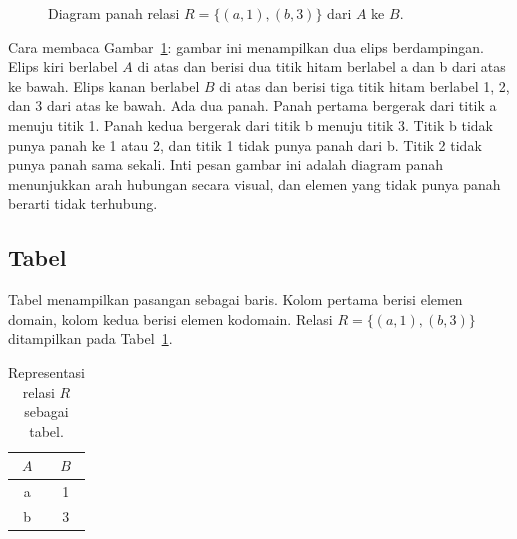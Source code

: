 \documentclass[11pt,a4paper]{article}
\begin{document}
\begin{figure}[H]
	\centering
	\caption{Diagram panah relasi $R=\{(a,1),(b,3)\}$ dari $A$ ke $B$.}
	\label{fig:panah}
\end{figure}

Cara membaca Gambar~\ref{fig:panah}: gambar ini menampilkan dua elips berdampingan. Elips kiri berlabel $A$ di atas dan berisi dua titik hitam berlabel a dan b dari atas ke bawah. Elips kanan berlabel $B$ di atas dan berisi tiga titik hitam berlabel 1, 2, dan 3 dari atas ke bawah. Ada dua panah. Panah pertama bergerak dari titik a menuju titik 1. Panah kedua bergerak dari titik b menuju titik 3. Titik b tidak punya panah ke 1 atau 2, dan titik 1 tidak punya panah dari b. Titik 2 tidak punya panah sama sekali. Inti pesan gambar ini adalah diagram panah menunjukkan arah hubungan secara visual, dan elemen yang tidak punya panah berarti tidak terhubung.

\subsection{Tabel}

Tabel menampilkan pasangan sebagai baris. Kolom pertama berisi elemen domain, kolom kedua berisi elemen kodomain. Relasi $R=\{(a,1),(b,3)\}$ ditampilkan pada Tabel~\ref{tab:relasi-tabel}.

\begin{table}[H]
	\centering
	\caption{Representasi relasi $R$ sebagai tabel.}
	\label{tab:relasi-tabel}
	\small
	\begin{tabular}{c c}
		\toprule
		$A$ & $B$ \\
		\midrule
		a   & 1   \\
		b   & 3   \\
		\bottomrule
	\end{tabular}
\end{table}
\end{document}
